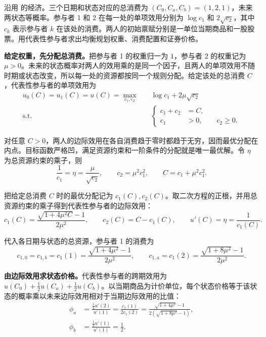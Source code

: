 \begin{tcolorbox}[example]
\begin{question}
 沿用 的经济。三个日期和状态对应的总消费为 $(C_0,C_a,C_b)=(1,2,1)$，未来两状态等概率。参与者 1 和 2 在每一处的单项效用分别为 $\log c_1$ 和 $2\sqrt{c_2}$，其中 $c_k$ 表示参与者 $k$ 在该处的消费。两人的初始禀赋分别是一单位当期商品和一股股票。用代表性参与者求出均衡规划权重、消费配置和证券价格。
\end{question}
\begin{solution}[blank-type=manual,blank-vsep=7\baselineskip]
\textbf{给定权重，先分配总消费。}把参与者 1 的权重归一为 $1$，参与者 2 的权重记为 $\mu>0$。未来的状态概率对两人的效用乘的是同一个因子，且两人的单项效用不随时期或状态改变，所以每一处的资源都按同一个规则分配。给定该处的总消费 $C$，代表性参与者的单项效用为
\[
 \begin{aligned}
 u_0(C)=u_1(C)=u(C)=\max_{c_1,c_2}\quad &\log c_1+2\mu\sqrt{c_2}\\
 \text{s.t.}\quad &
 \left\{\begin{aligned}
 c_1+c_2&=C,\\
 c_1&>0,\qquad c_2\ge0.
 \end{aligned}\right.
 \end{aligned}
\]

对任意 $C>0$，两人的边际效用在各自消费趋于零时都趋于无穷，因而最优分配在内点。目标函数严格凹，满足资源约束和一阶条件的分配就是唯一最优解。令 $\eta$ 为总资源约束的乘子，则
\[
 \frac1{c_1}=\eta=\frac{\mu}{\sqrt{c_2}},
 \qquad
 c_2=\mu^2c_1^2,\qquad C=c_1+\mu^2c_1^2.
\]

把给定总消费 $C$ 时的最优分配记为 $c_1(C),c_2(C)$。取二次方程的正根，并用总资源约束的乘子得到代表性参与者的边际效用：
\[
 c_1(C)=\frac{\sqrt{1+4\mu^2C}-1}{2\mu^2},\qquad
 c_2(C)=C-c_1(C),\qquad u'(C)=\eta=\frac1{c_1(C)}.
\]

代入各日期与状态的总资源，参与者 1 的消费为
\[
 c_{1,0}=c_{1,b}=c_1(1)=\frac{\sqrt{1+4\mu^2}-1}{2\mu^2},
 \qquad
 c_{1,a}=c_1(2)=\frac{\sqrt{1+8\mu^2}-1}{2\mu^2}.
\]

\textbf{由边际效用求状态价格。}代表性参与者的跨期效用为 $u(C_0)+\tfrac12 u(C_a)+\tfrac12 u(C_b)$。以当期商品为计价单位，每个状态价格等于该状态的概率乘以未来边际效用相对于当期边际效用的比值：
\[
 \begin{aligned}
 \phi_a&=\frac{\tfrac12 u'(2)}{u'(1)}
       =\frac{c_1(1)}{2c_1(2)}
       =\frac{\sqrt{1+4\mu^2}-1}{2(\sqrt{1+8\mu^2}-1)},\\
 \phi_b&=\frac{\tfrac12 u'(1)}{u'(1)}=\frac12.
 \end{aligned}
\]


\end{solution}
\end{tcolorbox}
